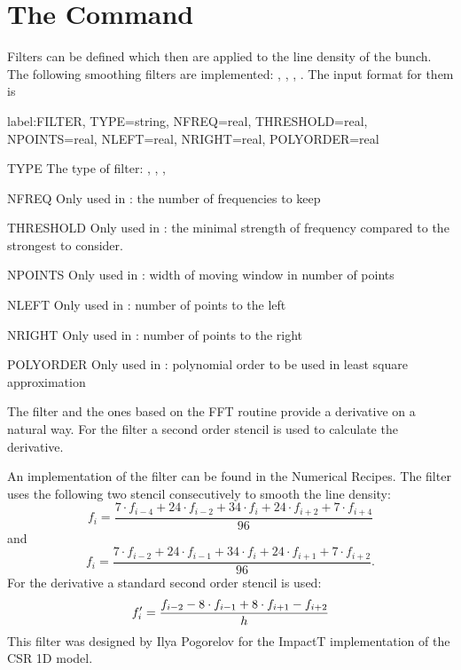 \section{The  Command}
Filters can be defined which then are applied to the line density of the bunch. The following smoothing filters are implemented: , , , . The input format for them is
\begin{example}
label:FILTER, TYPE=string, NFREQ=real, THRESHOLD=real,
      NPOINTS=real, NLEFT=real, NRIGHT=real,
      POLYORDER=real
\end{example}
\begin{kdescription}
\item[TYPE]
  The type of filter: , , , 
\item[NFREQ]
  Only used in : the number of frequencies to keep
\item[THRESHOLD]
  Only used in : the minimal strength of frequency compared to the strongest to consider.
\item[NPOINTS]
  Only used in : width of moving window in number of points
\item[NLEFT]
  Only used in : number of points to the left
\item[NRIGHT]
  Only used in : number of points to the right
\item[POLYORDER]
  Only used in : polynomial order to be used in least square approximation
\end{kdescription}
The  filter and the ones based on the FFT routine provide a derivative on a natural way. For the  filter a second order stencil is used to calculate the derivative.

An implementation of the  filter can be found in the Numerical Recipes. The  filter uses the following two stencil consecutively to smooth the line density:
$$f_i = \frac{7\cdot f_{i-4} + 24\cdot f_{i-2} + 34\cdot f_{i} + 24\cdot f_{i+2} + 7\cdot f_{i+4}}{96}$$
and
$$f_i = \frac{7\cdot f_{i-2} + 24\cdot f_{i-1} + 34\cdot f_{i} + 24\cdot f_{i+1} + 7\cdot f_{i+2}}{96}.$$
For the derivative a standard second order stencil is used:
$$f^{\prime}_i = \frac{f_{i-2} - 8\cdot f_{i-1} + 8\cdot f_{i+1} - f_{i+2}}{h}$$
This filter was designed by Ilya Pogorelov for the ImpactT implementation of the CSR 1D model.

